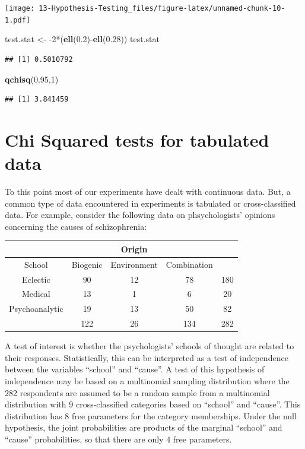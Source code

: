 \documentclass[]{book}
\newenvironment{Shaded}{\begin{snugshade}}{\end{snugshade}}
\newcommand{\KeywordTok}[1]{\textcolor[rgb]{0.13,0.29,0.53}{\textbf{{#1}}}}
\newcommand{\DecValTok}[1]{\textcolor[rgb]{0.00,0.00,0.81}{{#1}}}
\newcommand{\FloatTok}[1]{\textcolor[rgb]{0.00,0.00,0.81}{{#1}}}
\newcommand{\StringTok}[1]{\textcolor[rgb]{0.31,0.60,0.02}{{#1}}}
\newcommand{\NormalTok}[1]{{#1}}
\begin{document}
\texttt{[image: 13-Hypothesis-Testing\_files/figure-latex/unnamed-chunk-10-1.pdf]}

\begin{Shaded}
\begin{Highlighting}[]
\NormalTok{test.stat <-}\StringTok{ }\NormalTok{-}\DecValTok{2}\NormalTok{*(}\KeywordTok{ell}\NormalTok{(}\FloatTok{0.2}\NormalTok{)-}\KeywordTok{ell}\NormalTok{(}\FloatTok{0.28}\NormalTok{))}
\NormalTok{test.stat}
\end{Highlighting}
\end{Shaded}

\begin{verbatim}
## [1] 0.5010792
\end{verbatim}

\begin{Shaded}
\begin{Highlighting}[]
\KeywordTok{qchisq}\NormalTok{(}\FloatTok{0.95}\NormalTok{,}\DecValTok{1}\NormalTok{)}
\end{Highlighting}
\end{Shaded}

\begin{verbatim}
## [1] 3.841459
\end{verbatim}

\section{Chi Squared tests for tabulated
data}\label{chi-squared-tests-for-tabulated-data}

To this point most of our experiments have dealt with continuous data.
But, a common type of data encountered in experiments is tabulated or
cross-classified data. For example, consider the following data on
phsychologists' opinions concerning the causes of schizophrenia:

\begin{longtable}[]{@{}ccccc@{}}
\toprule
& & Origin & &\tabularnewline
\midrule
\endhead
School & Biogenic & Environment & Combination &\tabularnewline
Eclectic & 90 & 12 & 78 & 180\tabularnewline
Medical & 13 & 1 & 6 & 20\tabularnewline
Psychoanalytic & 19 & 13 & 50 & 82\tabularnewline
& 122 & 26 & 134 & 282\tabularnewline
\bottomrule
\end{longtable}

A test of interest is whether the psychologists' schools of thought are
related to their responses. Statistically, this can be interpreted as a
test of independence between the variables ``school'' and ``cause''. A
test of this hypothesis of independence may be based on a multinomial
sampling distribution where the 282 respondents are assumed to be a
random sample from a multinomial distribution with 9 cross-classified
categories based on ``school'' and ``cause''. This distribution has 8
free parameters for the category memberships. Under the null hypothesis,
the joint probabilities are products of the marginal ``school'' and
``cause'' probabilities, so that there are only 4 free parameters.
\end{document}
